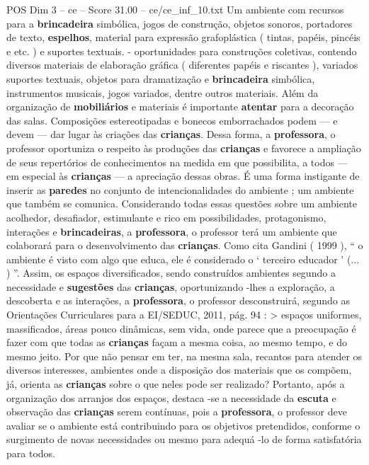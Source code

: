 \begin{textsample}{POS Dim 3 – ce – Score 31.00 – ce/ce\_inf\_10.txt}
Um ambiente com recursos para a \textbf{brincadeira} simbólica, jogos de construção, objetos sonoros, portadores de texto, \textbf{espelhos}, material para expressão grafoplástica ( tintas, papéis, pincéis e etc. ) e suportes textuais. - oportunidades para construções coletivas, contendo diversos materiais de elaboração gráfica ( diferentes papéis e riscantes ), variados suportes textuais, objetos para dramatização e \textbf{brincadeira} simbólica, instrumentos musicais, jogos variados, dentre outros materiais.
Além da organização de \textbf{mobiliários} e materiais é importante \textbf{atentar} para a decoração das salas.
Composições estereotipadas e bonecos emborrachados podem — e devem — dar lugar às criações das \textbf{crianças}.
Dessa forma, a \textbf{professora}, o professor oportuniza o respeito às produções das \textbf{crianças} e favorece a ampliação de seus repertórios de conhecimentos na medida em que possibilita, a todos — em especial às \textbf{crianças} — a apreciação dessas obras.
É uma forma instigante de inserir as \textbf{paredes} no conjunto de intencionalidades do ambiente ; um ambiente que também se comunica.
Considerando todas essas questões sobre um ambiente acolhedor, desafiador, estimulante e rico em possibilidades, protagonismo, interações e \textbf{brincadeiras}, a \textbf{professora}, o professor terá um ambiente que colaborará para o desenvolvimento das \textbf{crianças}.
Como cita Gandini ( 1999 ), “ o ambiente é visto com algo que educa, ele é considerado o ‘ terceiro educador ’ (... ) ”.
Assim, os espaços diversificados, sendo construídos ambientes segundo a necessidade e \textbf{sugestões} das \textbf{crianças}, oportunizando -lhes a exploração, a descoberta e as interações, a \textbf{professora}, o professor desconstruirá, segundo as Orientações Curriculares para a EI/SEDUC, 2011, pág. 94 : > espaços uniformes, massificados, áreas pouco dinâmicas, sem vida, onde parece que a preocupação é fazer com que todas as \textbf{crianças} façam a mesma coisa, ao mesmo tempo, e do mesmo jeito.
Por que não pensar em ter, na mesma sala, recantos para atender os diversos interesses, ambientes onde a disposição dos materiais que os compõem, já, orienta as \textbf{crianças} sobre o que neles pode ser realizado?
Portanto, após a organização dos arranjos dos espaços, destaca -se a necessidade da \textbf{escuta} e observação das \textbf{crianças} serem contínuas, pois a \textbf{professora}, o professor deve avaliar se o ambiente está contribuindo para os objetivos pretendidos, conforme o surgimento de novas necessidades ou mesmo para adequá -lo de forma satisfatória para todos.

\end{textsample}
